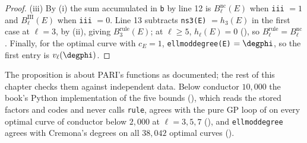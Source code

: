 \begin{sloppypar}
\begin{proof}
(iii) By (i) the sum accumulated in \texttt{b} by line 12 is $B^{\mathrm{nc}}_\ell(E)$ when \texttt{iii} $=1$ and $B^{\mathrm{III}}_\ell(E)$ when \texttt{iii} $=0$. Line 13
subtracts \texttt{ns3(E)} $=h_3(E)$ in the first case at $\ell=3$, by (ii), giving $B^{\mathrm{rule}}_3(E)$; at $\ell\ge5$, $h_\ell(E)=0$ (), so
$B^{\mathrm{rule}}_\ell=B^{\mathrm{nc}}_\ell$. Finally, for the optimal curve with $c_E=1$, \texttt{ellmoddegree(E)} $=\degphi$, so the first entry is $v_\ell(\degphi)$.
\end{proof}

The proposition is about PARI's functions as documented; the rest of this chapter checks them against independent data. Below conductor $10{,}000$
the book's Python implementation of the five bounds (), which reads the stored factors and codes and never
calls \texttt{rule}, agrees with the pure GP loop of  on every optimal curve of conductor below $2{,}000$ at
$\ell=3,5,7$ (), and \texttt{ellmoddegree} agrees with Cremona's degrees on all $38{,}042$ optimal curves
().


\end{sloppypar}

